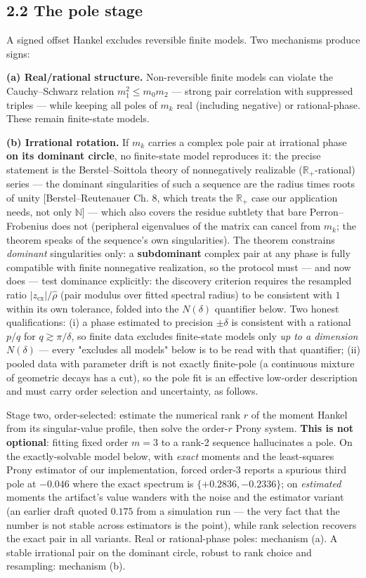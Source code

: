 \documentclass[11pt]{article}
\begin{document}
\subsection*{2.2 The pole stage}
A signed offset Hankel excludes reversible finite models.  Two mechanisms produce signs:

\textbf{(a) Real/rational structure.}  Non-reversible finite models can violate the Cauchy–Schwarz relation $m_1^2 \le m_0 m_2$ — strong pair correlation with suppressed triples — while keeping all poles of $m_k$ real (including negative) or rational-phase.  These remain finite-state models.

\textbf{(b) Irrational rotation.}  If $m_k$ carries a complex pole pair at irrational phase \textbf{on its dominant circle}, no finite-state model reproduces it: the precise statement is the Berstel–Soittola theory of nonnegatively realizable ($\mathbb R_+$-rational) series — the dominant singularities of such a sequence are the radius times roots of unity [Berstel–Reutenauer Ch. 8, which treats the $\mathbb R_+$ case our application needs, not only $\mathbb N$] — which also covers the residue subtlety that bare Perron–Frobenius does not (peripheral eigenvalues of the matrix can cancel from $m_k$; the theorem speaks of the sequence's own singularities).  The theorem constrains \emph{dominant} singularities only: a \textbf{subdominant} complex pair at any phase is fully compatible with finite nonnegative realization, so the protocol must — and now does — test dominance explicitly: the discovery criterion requires the resampled ratio $|z_{\mathrm{cx}}|/\hat\rho$ (pair modulus over fitted spectral radius) to be consistent with $1$ within its own tolerance, folded into the $N(\delta)$ quantifier below.  Two honest qualifications: (i) a phase estimated to precision $\pm\delta$ is consistent with a rational $p/q$ for $q \gtrsim \pi/\delta$, so finite data excludes finite-state models only \emph{up to a dimension} $N(\delta)$ — every "excludes all models" below is to be read with that quantifier; (ii) pooled data with parameter drift is not exactly finite-pole (a continuous mixture of geometric decays has a cut), so the pole fit is an effective low-order description and must carry order selection and uncertainty, as follows.

Stage two, order-selected: estimate the numerical rank $r$ of the moment Hankel from its singular-value profile, then solve the order-$r$ Prony system.  \textbf{This is not optional}: fitting fixed order $m = 3$ to a rank-2 sequence hallucinates a pole.  On the exactly-solvable model below, with \emph{exact} moments and the least-squares Prony estimator of our implementation, forced order-3 reports a spurious third pole at $-0.046$ where the exact spectrum is $\{+0.2836, -0.2336\}$; on \emph{estimated} moments the artifact's value wanders with the noise and the estimator variant (an earlier draft quoted $0.175$ from a simulation run — the very fact that the number is not stable across estimators is the point), while rank selection recovers the exact pair in all variants. Real or rational-phase poles: mechanism (a).  A stable irrational pair on the dominant circle, robust to rank choice and resampling: mechanism (b).
\end{document}
